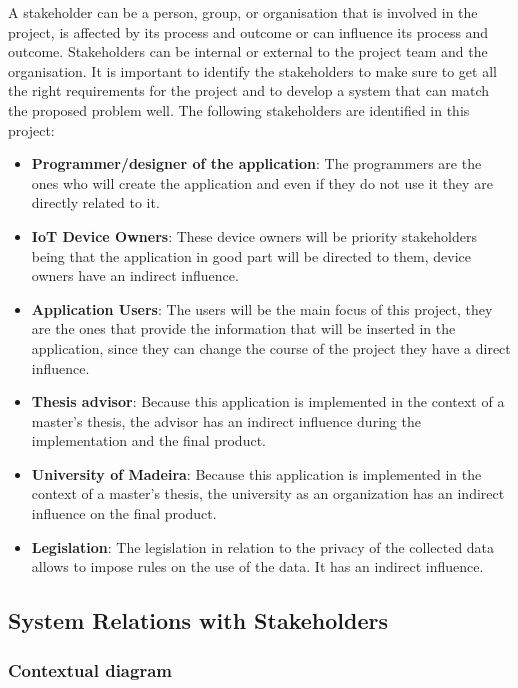 A stakeholder can be a person, group, or organisation that is involved in
the project, is affected by its process and outcome or can influence its
process and outcome. Stakeholders can be internal or external to the project
team and the organisation.
\newline
It is important to identify the stakeholders to make sure to get all the
right requirements for the project and to develop a system that can match
the proposed problem well.
\newline
The following stakeholders are identified in this project:
\begin{itemize}
    \item \textbf{Programmer/designer of the application}: The programmers are the ones who will create the application and even if they do not use it they are directly related to it.
    \item \textbf{IoT Device Owners}: These device owners will be priority stakeholders being that the application in good part will be directed to them, device owners have an indirect influence.
    \item \textbf{Application Users}: The users will be the main focus of this project, they are the ones that provide the information that will be inserted in the application, since they can change the course of the project they have a direct influence.
    \item \textbf{Thesis advisor}: Because this application is implemented in the context of a master's thesis, the advisor has an indirect influence during the implementation and the final product.
    \item \textbf{University of Madeira}: Because this application is implemented in the context of a master's thesis, the university as an organization has an indirect influence on the final product.
    \item \textbf{Legislation}: The legislation in relation to the privacy of the collected data allows to impose rules on the use of the data. It has an indirect influence.
\end{itemize}

\subsection*{System Relations with Stakeholders}

\subsubsection*{Contextual diagram}

